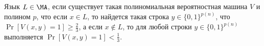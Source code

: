 Язык $L \in \MA$, если  существует такая полиномиальная вероятностная машина $V$ и полином $p$, что если $x \in L$, то
найдется такая строка $y \in \{0, 1\}^{p(n)}$, что $\Pr[V(x, y) = 1] \ge \frac{2}{3}$, а если $x \notin L$, то для любой
строки $y \in \{0, 1\}^{p(n)}$ выполняется $\Pr[V(x, y) = 1] < \frac{1}{3}$.